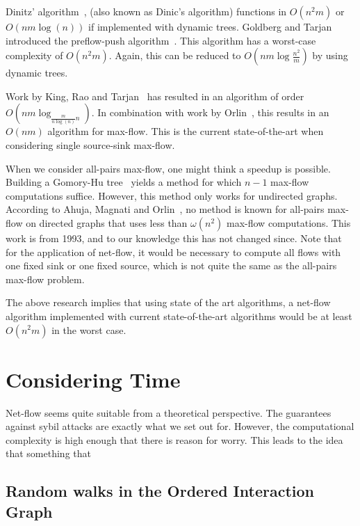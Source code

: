 \documentclass[a4paper,11pt]{book}
\theoremstyle{definition}
\begin{document}
Dinitz' algorithm~\cite{dinitz2006dinitz}, (also known as Dinic's algorithm) functions
in $O(n^2m)$ or $O(nm\log(n))$ if implemented with dynamic trees. Goldberg and Tarjan
introduced the preflow-push algorithm~\cite{goldberg1988new}. This algorithm
has a worst-case complexity of $O(n^2m)$. Again, this can be reduced to
$O(nm\log\frac{n^2}{m})$ by using dynamic trees.

Work by King, Rao and Tarjan~\cite{king1992faster} has resulted in an algorithm of
order $O(nm\log_{\frac{m}{n\log(n)}n})$. In combination with work by Orlin~\cite{orlin2013max},
this results in an $O(nm)$ algorithm for max-flow. This is the current state-of-the-art
when considering single source-sink max-flow.

When we consider all-pairs max-flow, one might think a speedup is possible. 
Building a Gomory-Hu tree~\cite{gomory1961multi} yields a method
for which $n-1$ max-flow computations suffice. However, this method only works for undirected graphs.
According to Ahuja, Magnati and Orlin~\cite{ahuja1993network}, no method is known for all-pairs max-flow
on directed graphs that uses less than $\omega(n^2)$ max-flow computations. This work is from
1993, and to our knowledge this has not changed since. Note that for the application of
net-flow, it would be necessary to compute all flows with one fixed sink or one fixed source,
which is not quite the same as the all-pairs max-flow problem.

The above research implies that using state of the art algorithms, a net-flow algorithm
implemented with current state-of-the-art algorithms would be at least $O(n^2m)$ in the
worst case. 




\chapter{Considering Time}
\label{chap:temporal_pr}

Net-flow seems quite suitable from a theoretical perspective. The guarantees against sybil 
attacks are exactly what we set out for. However, the computational complexity is high
enough that there is reason for worry. This leads to the idea that something that 


\section{Random walks in the Ordered Interaction Graph}
\end{document}
